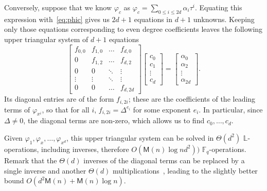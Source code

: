 \documentclass[sigconf]{acmart}
\newcommand{\M}{\mathsf{M}}
\newcommand{\F}{\mathbb{F}}
\renewcommand{\L}{\mathbb{L}}
\begin{document}
Conversely, suppose that we know $\varphi_c$ as $\varphi_c = \sum_{0 \le i
  \le 2d} \alpha_i \tau^i$. Equating this expression
with~\eqref{eq:phic} gives us $2d+1$ equations in $d+1$
unknowns. Keeping only those equations corresponding to even degree
coefficients leaves the following upper triangular system of $d + 1$
equations
\begin{equation}
\begin{bmatrix} f_{0,0} & f_{1,0} & \ldots & f_{d, 0} \\
                 0      & f_{1,2} & \ldots & f_{d, 2}  \\
                 0      & 0       & \ddots & \vdots                      \\
                 \vdots  & \vdots  &  \ddots      & \vdots                       \\
                 0  & 0 & \ldots & f_{d, 2d}
\end{bmatrix}
\begin{bmatrix}
  c_0 \\ c_1 \\ \vdots \\ c_d
\end{bmatrix} = \begin{bmatrix} \alpha_{0} \\ \alpha_{2} \\ \vdots \\ \alpha_{2d} \end{bmatrix}.
\end{equation}
Its diagonal entries are of the form $f_{i,2i}$; these are the
coefficients of the leading terms of $\varphi_{x^i}$, so that for all
$i$, $f_{i,2i} = \Delta^{e_i}$ for some exponent $e_i$. In particular,
since $\Delta \neq 0$, the diagonal terms are non-zero, which allows
us to find $c_0,\dots,c_{d}$.

Given $\varphi_1,\varphi_x,\dots,\varphi_{x^d}$, this upper triangular system
can be solved in $\Theta(d^2)$ $\L$-operations, including inverses,
therefore $O( \M(n)\log n d^2))$ $\F_q$-operations. Remark that the
$\Theta(d)$ inverses of the diagonal terms can be replaced by a single
inverse and another $\Theta(d)$ multiplications~\cite[p.~66]{Montgomery92},
leading to the slightly better bound $O(d^2 \M(n) + \M(n)\log n)$.

\end{document}
